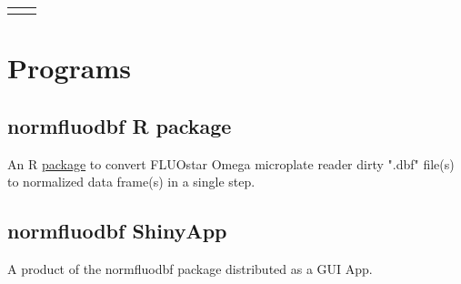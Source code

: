 \documentclass[
	10pt, %
]{FreemanCV_MOD}
\begin{document}
\begin{paracol}{2}
\begin{supertabular}{r l}
	
	
	
\end{supertabular}


\section{Programs}

\subsection{normfluodbf R package}
An R \href{https://www.cran-e.com/package/normfluodbf}{package} to convert FLUOstar Omega microplate reader dirty ".dbf" file(s) to normalized data frame(s) in a single step.

\subsection{normfluodbf ShinyApp}
A product of the normfluodbf package distributed as a GUI App.

\end{paracol} %

\end{document}
